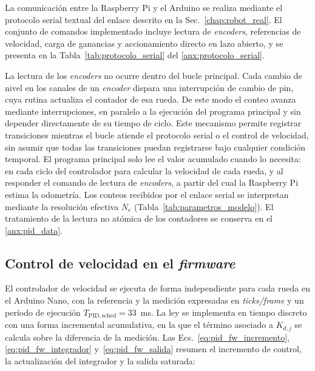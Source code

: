 La comunicación entre la Raspberry Pi y el \gls{Arduino} se realiza mediante el protocolo serial textual del enlace descrito en la Sec.~\ref{chap:robot_real}. El conjunto de comandos implementado incluye lectura de \textit{encoders}, referencias de velocidad, carga de ganancias y accionamiento directo en lazo abierto, y se presenta en la Tabla~\ref{tab:protocolo_serial} del \ref{anx:protocolo_serial}.

La lectura de los \textit{encoders} no ocurre dentro del bucle principal. Cada cambio
de nivel en los canales de un \textit{encoder} dispara una interrupción de cambio de
pin, cuya rutina actualiza el contador de esa rueda. De este modo el conteo
avanza mediante interrupciones, en paralelo a la ejecución del programa principal
y sin depender directamente de su tiempo de ciclo. Este mecanismo permite
registrar transiciones mientras el bucle atiende el protocolo serial o el control
de velocidad, sin asumir que todas las transiciones puedan registrarse bajo cualquier
condición temporal. El programa principal solo
lee el valor acumulado cuando lo necesita: en cada ciclo del controlador para calcular
la velocidad de cada rueda, y al responder el comando de lectura de \textit{encoders},
a partir del cual la Raspberry Pi estima la odometría.
Los conteos recibidos por el enlace serial se interpretan mediante la
resolución efectiva $N_e$ (Tabla~\ref{tab:parametros_modelo}). El
tratamiento de la lectura no atómica de los contadores se conserva en el
\ref{anx:pid_data}.

\subsection{Control de velocidad en el \texorpdfstring{\textit{firmware}}{firmware}}
\label{sec:motorcontrol_pid}

El controlador de velocidad se ejecuta de forma independiente para cada rueda en el Arduino Nano, con la referencia y la medición expresadas en \textit{ticks/frame} y un período de ejecución $T_{\mathrm{PID,sched}}=33$~ms. La ley se implementa en tiempo discreto con una forma incremental acumulativa, en la que el término asociado a $K_{d,j}$ se calcula sobre la diferencia de la medición. Las Ecs.~\eqref{eq:pid_fw_incremento}, \eqref{eq:pid_fw_integrador} y~\eqref{eq:pid_fw_salida} resumen el incremento de control, la actualización del integrador y la salida saturada:

